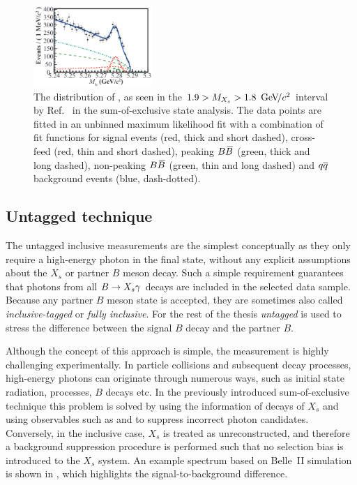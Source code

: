 \begin{figure}[hbtp!]
    \centering
    \includegraphics[width=0.4\textwidth]{figures/experiment_overview/Mbc_sum_exclusive_Belle.png}
    \caption{\label{fig:mbc_sum_of_exclusive} 
    The distribution of \Mbc, as seen in the $1.9>M_{X_s}>1.8~{\mathrm{\,Ge\kern -0.1em V\!/}c^2}$ interval by Ref.~\cite{Belle:2014nmp} in the sum-of-exclusive state analysis.
    The data points are fitted in an unbinned maximum likelihood fit with a combination of fit functions for 
    signal events (red, thick and short dashed), 
    cross-feed (red, thin and short dashed), 
    peaking $B\kern 0.18em\overline{\kern -0.18em B}{}$ (green, thick and long dashed), 
    non-peaking $B\kern 0.18em\overline{\kern -0.18em B}{}$ (green, thin and long dashed)
    and $q\overline q$ background events (blue, dash-dotted).
    }
\end{figure}

\subsection{Untagged technique}\label{sec:untagged}
The untagged inclusive measurements are the simplest conceptually as they only require a high-energy photon in the final state, without any explicit assumptions about the $X_s$ or partner $B$ meson decay.
Such a simple requirement guarantees that photons from all $\BtoXsgamma$ decays are included in the selected data sample.
Because any partner $B$ meson state is accepted, they are sometimes also called \textit{inclusive-tagged} or \textit{fully inclusive}.
For the rest of the thesis \textit{untagged} is used to stress the difference between the signal $B$ decay and the partner $B$.

Although the concept of this approach is simple, the measurement is highly challenging experimentally.
In particle collisions and subsequent decay processes, high-energy photons can originate through numerous ways, such as initial \epem state radiation, \epem\ra\qqbar processes, $B$ decays etc.
In the previously introduced sum-of-exclusive technique this problem is solved by using the information of decays of $X_s$ and using observables such as \Mbc and \DeltaE to suppress incorrect photon candidates. 
Conversely, in the inclusive case, $X_s$ is treated as unreconstructed, and therefore a background suppression procedure is performed such that no selection bias is introduced to the $X_s$ system.
An example spectrum based on Belle~II simulation is shown in , which highlights the signal-to-background difference.

